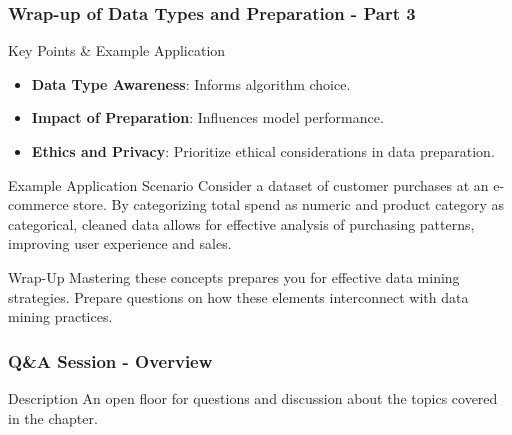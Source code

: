 \documentclass{beamer}
\begin{document}
\begin{frame}[fragile]
    \frametitle{Wrap-up of Data Types and Preparation - Part 3}
    \begin{block}{Key Points & Example Application}
        \begin{itemize}
            \item \textbf{Data Type Awareness}: Informs algorithm choice.
            \item \textbf{Impact of Preparation}: Influences model performance.
            \item \textbf{Ethics and Privacy}: Prioritize ethical considerations in data preparation.
        \end{itemize}
    \end{block}
    
    \begin{block}{Example Application Scenario}
        Consider a dataset of customer purchases at an e-commerce store. 
        By categorizing total spend as numeric and product category as categorical, 
        cleaned data allows for effective analysis of purchasing patterns, improving user experience and sales.
    \end{block}

    \begin{block}{Wrap-Up}
        Mastering these concepts prepares you for effective data mining strategies.
        Prepare questions on how these elements interconnect with data mining practices.
    \end{block}
\end{frame}

\begin{frame}[fragile]
    \frametitle{Q\&A Session - Overview}
    \begin{block}{Description}
        An open floor for questions and discussion about the topics covered in the chapter.
    \end{block}
\end{frame}
\end{document}

